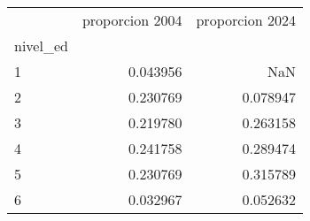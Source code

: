 \begin{tabular}{lrr}
\toprule
 & proporcion 2004 & proporcion 2024 \\
nivel_ed &  &  \\
\midrule
1 & 0.043956 & NaN \\
2 & 0.230769 & 0.078947 \\
3 & 0.219780 & 0.263158 \\
4 & 0.241758 & 0.289474 \\
5 & 0.230769 & 0.315789 \\
6 & 0.032967 & 0.052632 \\
\bottomrule
\end{tabular}
